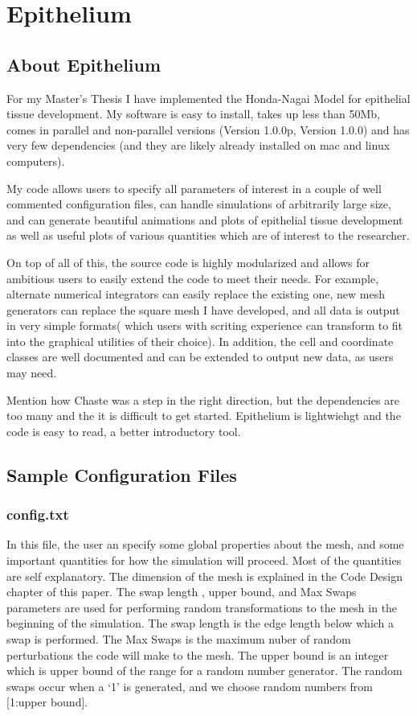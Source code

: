 \chapter{Epithelium}

\section{About Epithelium}
For my Master's Thesis I have implemented the Honda-Nagai Model for epithelial tissue development. My software is easy to install, takes up less than 50Mb, comes in parallel and non-parallel versions (Version 1.0.0p, Version 1.0.0) and has very few dependencies (and they are likely already installed on mac and linux computers). 

My code allows users to specify all parameters of interest in a couple of well commented configuration files, can handle simulations of arbitrarily large size, and can generate beautiful animations and plots of epithelial tissue development as well as useful plots of various quantities which are of interest to the researcher. 

On top of all of this, the source code is highly modularized and allows for ambitious users to easily extend the code to meet their needs. For example, alternate numerical integrators can easily replace the existing one, new mesh generators can replace the square mesh I have developed, and all data is output in very simple formats( which users with scriting experience can transform to fit into the graphical utilities of their choice). In addition, the cell and coordinate classes are well documented and can be extended to output new data, as users may need.


Mention how Chaste was a step in the right direction, but the dependencies are too many and the it is difficult to get started. Epithelium is lightwiehgt and the code is easy to read, a better introductory tool. 

\section{Sample Configuration Files}
\subsection{config.txt}
In this file, the user an specify some global properties about the mesh, and some important quantities for how the simulation will proceed. Most of the quantities are self explanatory. The dimension of the mesh is explained in the Code Design chapter of this paper. The swap length , upper bound, and Max Swaps parameters are used for performing random transformations to the mesh in the beginning of the simulation. The swap length is the edge length below which a swap is performed. The Max Swaps is the maximum nuber of random perturbations the code will make to the mesh. The upper bound is an integer which is upper bound of the range for a random number generator. The random swaps occur when a `1' is generated, and we choose random numbers from [1:upper bound].

